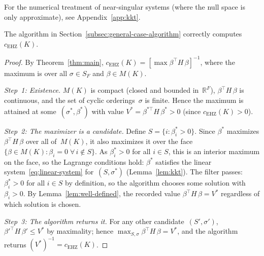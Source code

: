 For the numerical treatment of near-singular systems
(where the null space is only approximate),
see Appendix~\ref{app:kkt}.

\begin{theorem}\label{thm:algorithm-correct}
The algorithm in Section~\ref{subsec:general-case-algorithm} correctly computes
$c_{\mathrm{EHZ}}(K)$.
\end{theorem}

\begin{proof}
By Theorem~\ref{thm:main},
$c_{\mathrm{EHZ}}(K)
= [\max \beta^\top H\, \beta]^{-1}$,
where the maximum is over all $\sigma \in S_F$ and
$\beta \in M(K)$.

\emph{Step~1: Existence.}
$M(K)$ is compact (closed and bounded in~$\mathbb{R}^F$),
$\beta^\top H\, \beta$ is continuous,
and the set of cyclic orderings~$\sigma$
is finite. Hence the maximum is attained at
some~$(\sigma^*, \beta^*)$ with value
$V^* = \beta^{*\top} H\, \beta^* > 0$
(since $c_{\mathrm{EHZ}}(K) > 0$).

\emph{Step~2: The maximizer is a candidate.}
Define $S = \{i : \beta^*_i > 0\}$.
Since $\beta^*$ maximizes
$\beta^\top H\, \beta$
over all of~$M(K)$, it also
maximizes it over the face
$\{\beta \in M(K) : \beta_i = 0 \;\forall\, i \notin S\}$.
As $\beta^*_i > 0$ for all $i \in S$, this is an interior
maximum on the face, so the Lagrange conditions hold:
$\beta^*$ satisfies the linear
system~\eqref{eq:linear-system} for~$(S, \sigma^*)$
(Lemma~\ref{lem:kkt}).
The filter passes: $\beta^*_i > 0$ for all $i \in S$ by
definition, so the algorithm chooses some solution with
$\beta_i > 0$.
By Lemma~\ref{lem:well-defined}, the recorded value
$\beta^\top H\, \beta = V^*$ regardless of which
solution is chosen.

\begin{sloppypar}
\emph{Step~3: The algorithm returns it.}
For any other candidate~$(S', \sigma')$, $\beta'^\top H\, \beta' \leq V^*$
by maximality; hence $\max_{S,\sigma} \beta^\top H\, \beta = V^*$,
and the algorithm returns $(V^*)^{-1} = c_{\mathrm{EHZ}}(K)$.
\end{sloppypar}
\end{proof}

